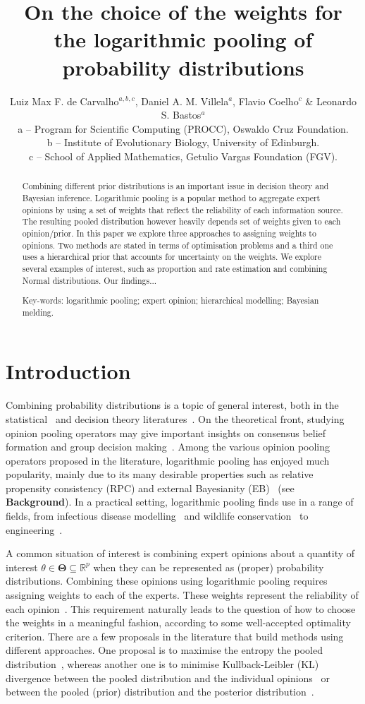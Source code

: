 \documentclass[a4paper, notitlepage, 10pt]{article}
\title{\vspace{-9ex}\centering \bf On the choice of the weights for the logarithmic pooling of probability distributions}
\author{
Luiz Max F. de Carvalho$^{a,b,c}$, Daniel A. M. Villela$^a$, Flavio Coelho$^c$ \& Leonardo S. Bastos$^a$ \\
a -- Program for Scientific Computing (PROCC), Oswaldo Cruz Foundation. \\
b -- Institute of Evolutionary Biology, University of Edinburgh.\\
c -- School of Applied Mathematics, Getulio Vargas Foundation (FGV).
}
\begin{document}
\maketitle

\begin{abstract}
Combining different prior distributions is an important issue in decision theory and Bayesian inference.
Logarithmic pooling is a popular method to aggregate expert opinions by using a set of weights that reflect the reliability of each information source.
The resulting pooled distribution however heavily depends set of weights given to each opinion/prior.
In this paper we explore three approaches to assigning weights to opinions.
Two methods are stated in terms of optimisation problems and a third one uses a hierarchical prior that accounts for uncertainty on the weights. 
We explore several examples of interest, such as proportion and rate estimation and combining Normal distributions.
Our findings...

Key-words: logarithmic pooling; expert opinion; hierarchical modelling; Bayesian melding. 
\end{abstract}

\section{Introduction}
\label{sec:intro}

Combining probability distributions is a topic of general interest, both in the statistical~\citep{west1984, genest1986A, genest1986B} and decision theory literatures~\citep{genest1984}.
On the theoretical front, studying opinion pooling operators may give important insights on consensus belief formation and group decision making~\citep{west1984,genest1986B}.
Among the various opinion pooling operators proposed in the literature, logarithmic pooling has enjoyed much popularity, mainly due to its many desirable properties such as relative propensity consistency (RPC) and external Bayesianity (EB)~\citep{genest1986A} (see \textbf{Background}). 
In a practical setting, logarithmic pooling finds use in a range of fields, from infectious disease modelling~\citep{Coelho2009} and wildlife conservation~\citep{poole2000} to engineering~\citep{lind1988, savchuk1994}.

A common situation of interest is combining expert opinions about a quantity of interest $\theta \in \mathbf{\Theta} \subseteq \mathbb{R}^p$ when they can be represented as (proper) probability distributions.
Combining these opinions using logarithmic pooling requires assigning weights to each of the experts.
These weights represent the reliability of each opinion~\citep{genest1984}.
This requirement naturally leads to the question of how to choose the weights in a meaningful fashion, according to some well-accepted optimality criterion.
There are a few proposals in the literature that build methods using different approaches.
One proposal is to maximise the entropy the pooled distribution~\citep{myung1996}, whereas another one is to minimise Kullback-Leibler (KL) divergence between the pooled distribution and the individual opinions~\citep{abbas2009} or between the pooled (prior) distribution and the posterior distribution~\citep{rufo2012A,rufo2012B}.
\end{document}
